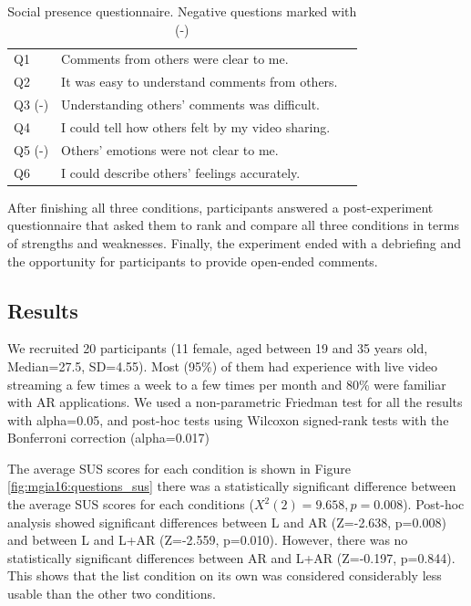 \begin{table}[h]
  \centering
  \caption{Social presence questionnaire. Negative questions marked with (-)}
  \label{table:social_questions}
  \begin{tabular}{lll}
    Q1 & Comments from others were clear to me.          \\
    Q2 & It was easy to understand comments from others. \\
    Q3 (-) & Understanding others' comments was difficult.  \\
    Q4 & I could tell how others felt by my video sharing.\\
    Q5 (-) & Others' emotions were not clear to me.\\
    Q6 & I could describe others' feelings accurately.
  \end{tabular}
\end{table}


After finishing all three conditions, participants answered a post-experiment questionnaire that asked them to rank and compare all three conditions in terms of strengths and weaknesses. Finally, the experiment ended with a debriefing and the opportunity for participants to provide open-ended comments.

\subsection{Results}

We recruited 20 participants (11 female, aged between 19 and 35 years old, Median=27.5, SD=4.55). Most (95\%) of them had experience with live video streaming a few times a week to a few times per month and 80\% were familiar with AR applications. We used a non-parametric Friedman test for all the results with alpha=0.05, and post-hoc tests using Wilcoxon signed-rank tests with the Bonferroni correction (alpha=0.017)

The average SUS scores for each condition is shown in Figure \ref{fig:mgia16:questions_sus} there was a statistically significant difference between the average SUS scores for each conditions ($X^2(2)=9.658, p=0.008$). Post-hoc analysis showed significant differences between L and AR (Z=-2.638, p=0.008) and between L and L+AR (Z=-2.559, p=0.010). However, there was no statistically significant differences between AR and L+AR (Z=-0.197, p=0.844). This shows that the list condition on its own was considered considerably less usable than the other two conditions.


